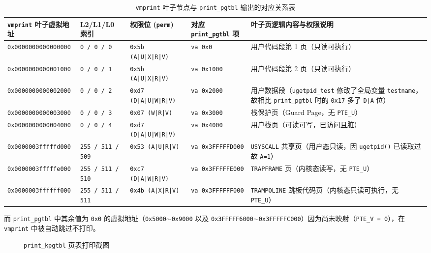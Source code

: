 \documentclass[12pt, a4paper]{ctexart}
\begin{document}
\begin{table}[H]
\centering
\small
\caption{\texttt{vmprint} 叶子节点与 \texttt{print\_pgtbl} 输出的对应关系表}
\label{tab:vmprint-leaf}
\begin{tabular}{@{}llllp{5.5cm}@{}}
\toprule
\textbf{\texttt{vmprint} 叶子虚拟地址} & \textbf{L2/L1/L0 索引} & \textbf{权限位 (\texttt{perm})} & \textbf{对应 \texttt{print\_pgtbl} 项} & \textbf{叶子页逻辑内容与权限说明} \\
\midrule
\texttt{0x0000000000000000} & \texttt{0 / 0 / 0} & \texttt{0x5b (A|U|X|R|V)} & \texttt{va 0x0} & 用户代码段第 1 页（只读可执行） \\
\texttt{0x0000000000001000} & \texttt{0 / 0 / 1} & \texttt{0x5b (A|U|X|R|V)} & \texttt{va 0x1000} & 用户代码段第 2 页（只读可执行） \\
\texttt{0x0000000000002000} & \texttt{0 / 0 / 2} & \texttt{0xd7 (D|A|U|W|R|V)} & \texttt{va 0x2000} & 用户数据段（\texttt{ugetpid\_test} 修改了全局变量 \texttt{testname}，故相比 \texttt{print\_pgtbl} 时的 \texttt{0x17} 多了 \texttt{D|A} 位） \\
\texttt{0x0000000000003000} & \texttt{0 / 0 / 3} & \texttt{0x07 (W|R|V)} & \texttt{va 0x3000} & 栈保护页（Guard Page，无 \texttt{PTE\_U}） \\
\texttt{0x0000000000004000} & \texttt{0 / 0 / 4} & \texttt{0xd7 (D|A|U|W|R|V)} & \texttt{va 0x4000} & 用户栈页（可读可写，已访问且脏） \\
\midrule
\texttt{0x0000003fffffd000} & \texttt{255 / 511 / 509} & \texttt{0x53 (A|U|R|V)} & \texttt{va 0x3FFFFFD000} & \texttt{USYSCALL} 共享页（用户态只读，因 \texttt{ugetpid()} 已读取过故 \texttt{A=1}） \\
\texttt{0x0000003fffffe000} & \texttt{255 / 511 / 510} & \texttt{0xc7 (D|A|W|R|V)} & \texttt{va 0x3FFFFFE000} & \texttt{TRAPFRAME} 页（内核态读写，无 \texttt{PTE\_U}） \\
\texttt{0x0000003ffffff000} & \texttt{255 / 511 / 511} & \texttt{0x4b (A|X|R|V)} & \texttt{va 0x3FFFFFF000} & \texttt{TRAMPOLINE} 跳板代码页（内核态只读可执行，无 \texttt{PTE\_U}） \\
\bottomrule
\end{tabular}
\end{table}

而 \texttt{print\_pgtbl} 中其余值为 \texttt{0x0} 的虚拟地址（\texttt{0x5000}$\sim$\texttt{0x9000} 以及 \texttt{0x3FFFFF6000}$\sim$\texttt{0x3FFFFFC000}）因为尚未映射（\texttt{PTE\_V = 0}），在 \texttt{vmprint} 中被自动跳过不打印。

\begin{figure}[H]
    \centering
    \caption{\texttt{print\_kpgtbl} 页表打印截图}
    \label{fig:print_kpgtbl}
\end{figure}
\end{document}
